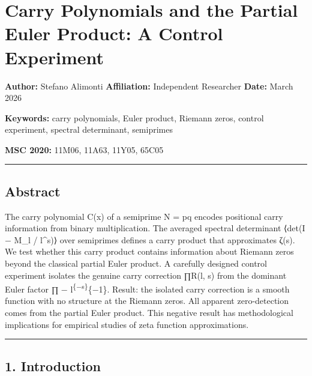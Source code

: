 \documentclass[
  11pt,
]{article}
\author{Stefano Alimonti --- stefalimonti@gmail.com}
\date{March 2026}
\begin{document}
{
\hypersetup{linkcolor=black}
\setcounter{tocdepth}{2}
\tableofcontents
}
\section{Carry Polynomials and the Partial Euler Product: A Control
Experiment}\label{carry-polynomials-and-the-partial-euler-product-a-control-experiment}

\textbf{Author:} Stefano Alimonti \textbf{Affiliation:} Independent Researcher
\textbf{Date:} March 2026

\textbf{Keywords:} carry polynomials, Euler product, Riemann zeros, control
experiment, spectral determinant, semiprimes

\textbf{MSC 2020:} 11M06, 11A63, 11Y05, 65C05

\begin{center}\rule{0.5\linewidth}{0.5pt}\end{center}

\newpage

\subsection{Abstract}\label{abstract}

The carry polynomial C(x) of a semiprime N = pq encodes positional carry
information from binary multiplication. The averaged spectral determinant
⟨\textbar det(I − M\_l / l\^{}s)\textbar⟩ over semiprimes defines a carry
product that approximates ζ(s). We test whether this carry product contains
information about Riemann zeros beyond the classical partial Euler product. A
carefully designed control experiment isolates the genuine carry correction
∏R(l, s) from the dominant Euler factor ∏ −
l\textsuperscript{\{−s\}\textbar{}}\{−1\}. Result: the isolated carry correction
is a smooth function with no structure at the Riemann zeros. All apparent
zero-detection comes from the partial Euler product. This negative result has
methodological implications for empirical studies of zeta function
approximations.

\begin{center}\rule{0.5\linewidth}{0.5pt}\end{center}

\newpage

\subsection{1. Introduction}\label{introduction}
\end{document}
